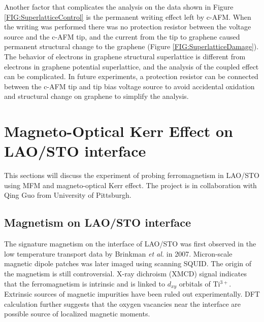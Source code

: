 \documentclass[pdflatex, sectionletters, 12pt]{pittetd}    %
\begin{document}
Another factor that complicates the analysis on the data shown in Figure \ref{FIG:SuperlatticeControl} is the permanent writing effect left by c-AFM. When the writing was performed there was no protection resistor between the voltage source and the c-AFM tip, and the current from the tip to graphene caused permanent structural change to the graphene (Figure \ref{FIG:SuperlatticeDamage}). The behavior of electrons in graphene structural superlattice\cite{jessen2019lithographic} is different from electrons in graphene potential superlattice, and the analysis of the coupled effect can be complicated. In future experiments, a protection resistor can be connected between the c-AFM tip and tip bias voltage source to avoid accidental oxidation and structural change on graphene to simplify the analysis.

\chapter{Magneto-Optical Kerr Effect on LAO/STO interface}
\label{SEC:Kerr}

This sections will discuss the experiment of probing ferromagnetism in LAO/STO using MFM and magneto-optical Kerr effect. The project is in collaboration with Qing Guo from University of Pittsburgh.

\section{Magnetism on LAO/STO interface}

The signature magnetism on the interface of LAO/STO was first observed in the low temperature transport data by Brinkman \textit{et al.} in 2007\cite{brinkman2007magnetic}. Micron-scale magnetic dipole patches was later imaged using scanning SQUID\cite{bert2011direct, kalisky2012scanning, kalisky2012critical}. The origin of the magnetism is still controversial. X-ray dichroism (XMCD) signal indicates that the ferromagnetism is intrinsic and is linked to $d_{xy}$ orbitals of Ti$^{3+}$\cite{lee2013titanium}. Extrinsic sources of magnetic impurities have been ruled out experimentally\cite{brinkman2007magnetic, lee2013titanium, ariando2011electronic}. DFT calculation further suggests that the oxygen vacancies near the interface are possible source of localized magnetic moments\cite{pentcheva2006charge}. 
\end{document}

